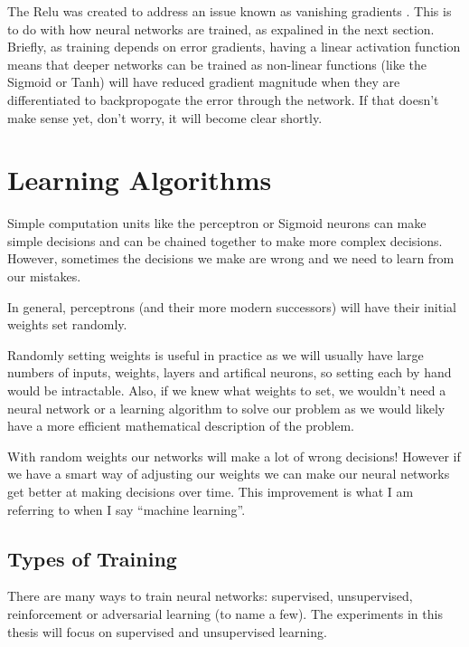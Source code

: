 The \ac{Relu} was created to address an issue known as vanishing gradients \cite{hochreiter1998vanishing}. This is to do with how neural networks are trained, as expalined in the next section. Briefly, as training depends on error gradients, having a linear activation function means that deeper networks  can be trained as non-linear functions (like the Sigmoid or \ac{Tanh}) will have reduced gradient magnitude when they are differentiated to backpropogate the error through the network. If that doesn't make sense yet, don't worry, it will become clear shortly.

\section{Learning Algorithms}
Simple computation units like the perceptron or Sigmoid neurons can make simple decisions and can be chained together to make more complex decisions. However, sometimes the decisions we make are wrong and we need to learn from our mistakes.

In general, perceptrons (and their more modern successors) will have their initial weights set randomly. 

Randomly setting weights is useful in practice as we will usually have large numbers of inputs, weights, layers and artifical neurons, so setting each by hand would be intractable. Also, if we knew what weights to set, we wouldn't need a neural network or a learning algorithm to solve our problem as we would likely have a more efficient mathematical description of the problem.

With random weights our networks will make a lot of wrong decisions! However if we have a smart way of adjusting our weights we can make our neural networks get better at making decisions over time. This improvement is what I am referring to when I say ``machine learning''.

\subsection{Types of Training}
There are many ways to train neural networks: supervised, unsupervised, reinforcement or 
adversarial learning (to name a few). The experiments in this thesis will focus on supervised and unsupervised learning. %


